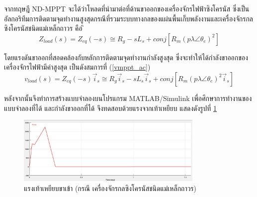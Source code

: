 \documentclass[11pt,a4paper]{article}
\begin{document}
จากทฤษฎี ND-MPPT จะได้ว่าโหลดที่นำมาต่อที่ด้านขาออกของเครื่องจักรไฟฟ้าซิงโครนัส ซึ่งเป็นอัลกอริทึมการติดตามจุดทำงานสูงสุดกรณีที่รวมระบบทางกลของแผ่นพื้นเก็บพลังงานและเครื่องจักรกลซิงโครนัสชนิดแม่เหล็กถาวร คือ
ิ\begin{equation} \label{zmppt_ac}
    Z_{load}(s)= Z_{eq} (-s) \cong R_{g} - sL_{s} + conj[R_{m}(p\lambda \angle \theta_{e})^2]  
\end{equation}

โดยแรงดันขาออกที่สอดคล้องกับหลักการติดตามจุดทำงานกำลังสูงสุด ซึ่งจะทำให้ได้กำลังขาออกของเครื่องจักรไฟฟ้ามีค่าสูงสุด เป็นดังสมการที่ (\ref{vmppt_ac})
\begin{equation}\label{vmppt_ac}
    v_{load}(s) = Z_{eq} (-s)\vec{i}_{s} \cong R_{g}\vec{i}_{s} - sL_{s}\vec{i}_{s} + conj[R_{m}(p\lambda \angle \theta_{e})^2 \vec{i}_{s}]
\end{equation}

หลังจากนั้นจึงทำการสร้างแบบจำลองบนโปรแกรม MATLAB/Simulink เพื่อศึกษาการทำงานของแบบจำลองที่ได้ และกำลังขาออกที่ได้ จึงทดสอบด้วยแรงจากเท้าเหยียบ แสดงดังรูปที่ \ref{force_sim} 
\begin{figure}[H]
    \begin{center}
        \includegraphics[width=0.8\textwidth]{force_sim.png}
    \end{center}
    \caption{แรงเท้าเหยียบขาเข้า (กรณี เครื่องจักรกลซิงโครนัสชนิดแม่เหล็กถาวร)}
    \label{force_sim}
\end{figure}
\end{document}

